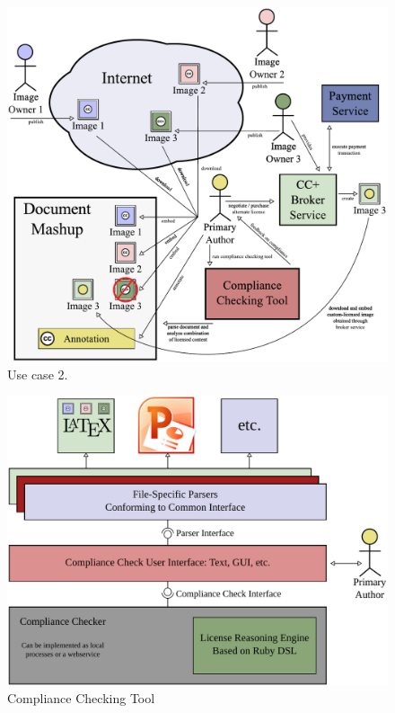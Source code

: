 \documentclass[botnum,fleqn,final]{unmeethesis}
\begin{document}
\begin{figure}[!htpb]
    \begin{center}
        \includegraphics[width=1.0\textwidth]{usecase2-full2.pdf}
    \end{center}
  \caption[Use case 2]{Use case 2.}
  \label{fi:usecase2}
\end{figure}

\begin{figure}[!htpb]
    \begin{center}
            \includegraphics[width=1.0\textwidth]{compliance-checking-tool.pdf}
    \end{center}
    \caption[Compliance Checking Tool]{Compliance Checking Tool}
    \label{fi:complianceCheckingTool}
\end{figure}
\end{document}
